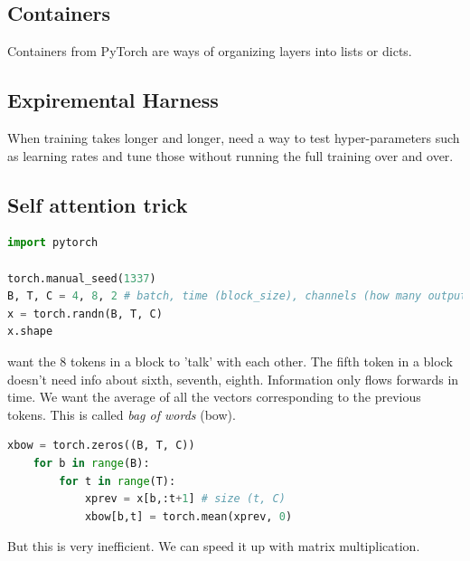 \documentclass{article}
\begin{document}
\subsection*{Containers}
Containers from PyTorch are ways of organizing layers into lists or dicts.  

\subsection*{Expiremental Harness}
When training takes longer and longer, need a way to test hyper-parameters such as learning rates and tune those without running the full training over and over.

\subsection*{Self attention trick}
\begin{lstlisting}[language=Python]    
import pytorch

torch.manual_seed(1337)
B, T, C = 4, 8, 2 # batch, time (block_size), channels (how many outputs)
x = torch.randn(B, T, C)
x.shape
\end{lstlisting}
want the 8 tokens in a block to 'talk' with each other.  
The fifth token in a block doesn't need info about sixth, seventh, eighth.  
Information only flows forwards in time.  We want the average of all the vectors corresponding to the previous tokens.  This is called \emph{bag of words} (bow).
\begin{lstlisting}[language=Python]
    xbow = torch.zeros((B, T, C))
    for b in range(B):
        for t in range(T):
            xprev = x[b,:t+1] # size (t, C)
            xbow[b,t] = torch.mean(xprev, 0)
\end{lstlisting}
But this is very inefficient.  
We can speed it up with matrix multiplication.
\end{document}
